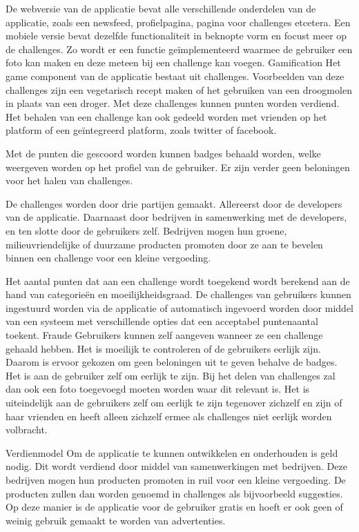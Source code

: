 \documentclass[11pt,fleqn,oneside,openany]{book} %
\begin{document}
De webversie van de applicatie bevat alle verschillende onderdelen van de applicatie, zoals een newsfeed, profielpagina, pagina voor challenges etcetera. Een mobiele versie bevat dezelfde functionaliteit in beknopte vorm en focust meer op de challenges. Zo wordt er een functie geïmplementeerd waarmee de gebruiker een foto kan maken en deze meteen bij een challenge kan voegen.
Gamification
Het game component van de applicatie bestaat uit challenges. Voorbeelden van deze challenges zijn een vegetarisch recept maken of het gebruiken van een droogmolen in plaats van een droger. Met deze challenges kunnen punten worden verdiend. Het behalen van een challenge kan ook gedeeld worden met vrienden op het platform of een geïntegreerd platform, zoals twitter of facebook.

Met de punten die gescoord worden kunnen badges behaald worden, welke weergeven worden op het profiel van de gebruiker. Er zijn verder geen beloningen voor het halen van challenges.

De challenges worden door drie partijen gemaakt. Allereerst door de developers van de applicatie. Daarnaast door bedrijven in samenwerking met de developers, en ten slotte door de gebruikers zelf. Bedrijven mogen hun groene, milieuvriendelijke of duurzame producten promoten door ze aan te bevelen binnen een challenge voor een kleine vergoeding.

Het aantal punten dat aan een challenge wordt toegekend wordt berekend aan de hand van categorieën en moeilijkheidsgraad. De challenges van gebruikers kunnen ingestuurd worden via de applicatie of automatisch ingevoerd worden door middel van een systeem met verschillende opties dat een acceptabel puntenaantal toekent.
Fraude
Gebruikers kunnen zelf aangeven wanneer ze een challenge gehaald hebben. Het is moeilijk te controleren of de gebruikers eerlijk zijn. Daarom is ervoor gekozen om geen beloningen uit te geven behalve de badges. Het is aan de gebruiker zelf om eerlijk te zijn. Bij het delen van challenges zal dan ook een foto toegevoegd moeten worden waar dit relevant is.
Het is uiteindelijk aan de gebruikers zelf om eerlijk te zijn tegenover zichzelf en zijn of haar vrienden en heeft alleen zichzelf ermee als challenges niet eerlijk worden volbracht.

Verdienmodel
Om de applicatie te kunnen ontwikkelen en onderhouden is geld nodig. Dit wordt verdiend door middel van samenwerkingen met bedrijven. Deze bedrijven mogen hun producten promoten in ruil voor een kleine vergoeding. De producten zullen dan worden genoemd in challenges als bijvoorbeeld suggesties. Op deze manier is de applicatie voor de gebruiker gratis en hoeft er ook geen of weinig gebruik gemaakt te worden van advertenties.
\end{document}
